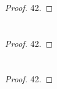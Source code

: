 \documentclass[
  coursecode={MTHE 477},
  assignmentname={Homework \homeworknumber},
  studentnumber=20053722,
  name={Bryan Hoang},
  draft,
]{
  ltxanswer%
}
\begin{document}
  \begin{questions}
    \setcounter{question}{\questionnumber}
    \addtocounter{question}{-1}
    \question[25]\
    \begin{parts}
      \part{}
      \begin{solution}
        \begin{proof}
          42.
        \end{proof}
      \end{solution}

      \part{}
      \begin{solution}
        \begin{proof}
          42.
        \end{proof}
      \end{solution}

      \part{}
      \begin{solution}
        \begin{proof}
          42.
        \end{proof}
      \end{solution}
    \end{parts}
  \end{questions}
\end{document}
